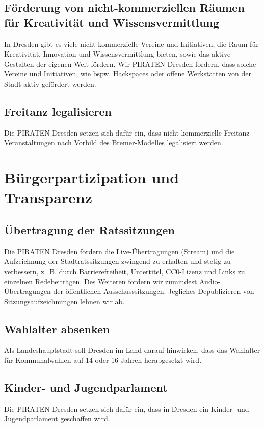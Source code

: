 \documentclass[a4paper, 11pt]{article}
\begin{document}
\subsection{Förderung von nicht-kommerziellen Räumen für Kreativität und Wissensvermittlung}
In Dresden gibt es viele nicht-kommerzielle Vereine und Initiativen, die Raum für Kreativität, Innovation und Wissensvermittlung bieten, sowie das aktive Gestalten der eigenen Welt fördern. Wir PIRATEN Dresden fordern, dass solche Vereine und Initiativen, wie bspw. Hackspaces oder offene Werkstätten von der Stadt aktiv gefördert werden.


\subsection{Freitanz legalisieren}
Die PIRATEN Dresden setzen sich dafür ein, dass nicht-kommerzielle Freitanz-Veranstaltungen nach Vorbild des Bremer-Modelles legalisiert werden.



\section{Bürgerpartizipation und Transparenz}

\subsection{Übertragung der Ratssitzungen}
Die PIRATEN Dresden fordern die Live-Übertragungen (Stream) und die Aufzeichnung der Stadtratssitzungen zwingend zu erhalten und stetig zu verbessern, z. B. durch Barrierefreiheit, Untertitel, CC0-Lizenz und Links zu einzelnen Redebeiträgen. Des Weiteren fordern wir zumindest Audio-Übertragungen der öffentlichen Ausschusssitzungen. Jegliches Depublizieren von Sitzungsaufzeichnungen lehnen wir ab.




\subsection{Wahlalter absenken}
Als Landeshauptstadt soll Dresden im Land darauf hinwirken, dass das Wahlalter für Kommunalwahlen auf 14 oder 16 Jahren herabgesetzt wird.


\subsection{Kinder- und Jugendparlament}
Die PIRATEN Dresden setzen sich dafür ein, dass in Dresden ein Kinder- und Jugendparlament geschaffen wird.
\end{document}
